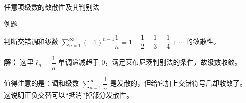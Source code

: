 \documentclass[aspectratio=169,10pt,fontset=fandol]{ctexbeamer}
\begin{document}
\begin{frame}[t,fragile]{任意项级数的敛散性及其判别法}
\normalsize
\begin{block}{例题}
{\normalsize
判断交错调和级数 \(\sum\limits_{n=1}^{\infty} (-1)^{n-1} \dfrac{1}{n} = 1 - \dfrac12 + \dfrac13 - \dfrac14 + \cdots\) 的敛散性。


}
\end{block}
\pause
{\normalsize
\textbf{解：}
这里 \(b_n = \dfrac{1}{n}\) 单调递减趋于 0，满足莱布尼茨判别法的条件，故级数收敛。



值得注意的是：调和级数 \(\sum \limits_{n=1}^{\infty}\dfrac{1}{n}\) 是发散的，但给它加上交错符号后却收敛了。这说明正负交替可以“抵消”掉部分发散性。


}
\end{frame}
\end{document}
